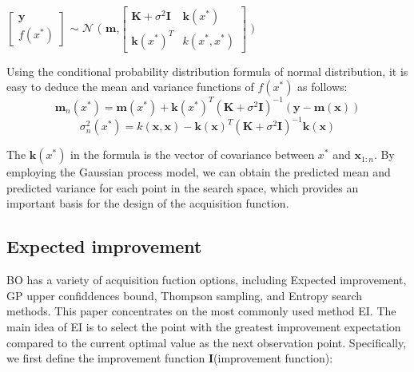 \documentclass{article}
\begin{document}
\hspace*{\fill}

\qquad \qquad \qquad \quad \quad \quad \quad \quad \quad \quad \quad \quad $\begin{bmatrix} \textbf{y} \\ f(x^*) \end{bmatrix}$ $\sim$ 
$\mathcal{N}$ $\Biggl($ $\textbf{m}$,$\begin{bmatrix} \textbf{K}+\sigma^2\textbf{I} & \textbf{k} (x^*)\\ 
\textbf{k} (x^*)^T & k(x^*,x^*) \end{bmatrix}$ $\Biggl)$\\

\hspace*{\fill}

Using the conditional probability distribution formula of normal distribution, it is easy to deduce the mean and variance functions of $f(x^*)$ as follows:
\begin{equation}\label{eq4}
\textbf{m}_n(x^*)=\textbf{m}(x^*)+\textbf{k}(x^*)^T(\textbf{K}+\sigma^2\textbf{I})^{-1}(\textbf{y}-\textbf{m}(\textbf{x}))
\end{equation}
\begin{equation}\label{eq5}
\sigma^2_n(x^*)=k(\textbf{x},\textbf{x})-\textbf{k}(\textbf{x})^T(\textbf{K}+\sigma^2\textbf{I})^{-1} \textbf{k}(\textbf{x})
\end{equation}

The $\textbf{k}(x^*)$ in the formula is the vector of covariance between $x^*$ and $\textbf{x}_{1:n}$.
By employing the Gaussian process model, we can obtain the predicted mean and predicted variance for each point in the search space, which provides an important basis for the design of the acquisition function.

\subsection{Expected improvement}
\hspace{2em}BO has a variety of acquisition fuction options, including Expected improvement\citep{Jones1998Efficient}, GP upper confiddences bound\citep{Srinivas2009Gaussian}, Thompson sampling\citep{Thompson1933On}, and Entropy search methods\citep{Hennig2012Entropy}. This paper concentrates on the most commonly used method EI. The main idea of EI is to select the point with the greatest improvement expectation compared to the current optimal value as the next observation point. Specifically, we first define the improvement function $\textbf{I}$(improvement function):
\end{document}
